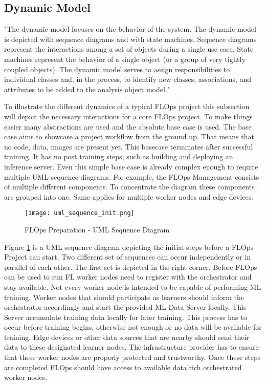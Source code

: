 \subsection{Dynamic Model}
"The dynamic model focuses on the behavior of the system. The dynamic model is
depicted with sequence diagrams and with state machines. Sequence diagrams represent the
interactions among a set of objects during a single use case. State machines represent the
behavior of a single object (or a group of very tightly coupled objects). The dynamic model
serves to assign responsibilities to individual classes and, in the process, to identify new classes,
associations, and attributes to be added to the analysis object model."

To illustrate the different dynamics of a typical FLOps project this subsection will depict the necessary interactions for a core FLOps project.
To make things easier many abstractions are used and the absolute base case is used.
The base case aims to showcase a project workflow from the ground up.
That means that no code, data, images are present yet.
This basecase terminates after successful training.
It has no post training steps, such as building and deploying an inference server.
Even this simple base case is already complex enough to require multiple UML sequence diagrams.
For example, the FLOps Management consists of multiple different components.
To concentrate the diagram these components are grouped into one.
Same applies for multiple worker nodes and edge devices.

\begin{figure}[h]
    \begin{adjustwidth}{-0.1\paperwidth}{-0.1\paperwidth}
        \centering
        \texttt{[image: uml\_sequence\_init.png]}
        \caption{FLOps Preparation - UML Sequence Diagram}
        \label{fig:uml_sequence_init}
    \end{adjustwidth}
\end{figure}

Figure \ref{fig:uml_sequence_init} is a UML sequence diagram depicting the initial steps before a FLOps Project can start.
Two different set of sequences can occur independently or in parallel of each other.
The first set is depicted in the right corner.
Before FLOps can be used to run FL worker nodes need to register with the orchestrator and stay available.
Not every worker node is intended to be capable of performing ML training.
Worker nodes that should participate as learners should inform the orchestrator accordingly and start the provided ML Data Server locally.
This Server accumulate training data locally for later training.
This process has to occur before training begins, otherwise not enough or no data will be available for training.
Edge devices or other data sources that are nearby should send their data to these designated learner nodes.
The infrastructure provider has to ensure that these worker nodes are properly protected and trustworthy.
Once these steps are completed FLOps should have access to available data rich orchestrated worker nodes.

